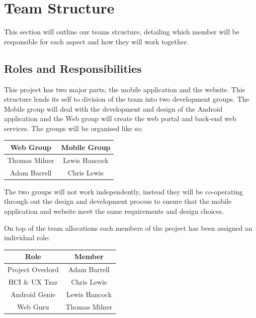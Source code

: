 \documentclass[11pt,a4paper]{article}
\begin{document}
\section{Team Structure}
\label{sec:team-structure}
This section will outline our teams structure, detailing which member will be responsible for each aspect and how they will work together. 

\subsection{Roles and Responsibilities}
This project has two major parts, the mobile application and the website. This structure lends its self to division of the team into two development groups. The Mobile group will deal with the development and design of the Android application and the Web group will create the web portal and back-end web services. The groups will be organised like so;  
\begin{table}[h]
\begin{center}
\begin{tabular}{|c|c|}
\hline
\textbf{Web Group} & \textbf{Mobile Group} \\
\hline
Thomas Milner & Lewis Hancock \\
Adam Barrell & Chris Lewis \\ \hline
\end{tabular}
\end{center}
\end{table}%

The two groups will not work independently, instead they will be co-operating through out the design and development process to ensure that the mobile application and website meet the same requirements and design choices. 

On top of the team allocations each members of the project has been assigned an individual role:

\begin{table}[h]
\begin{center}
\begin{tabular}{|c|c|}
\hline
\textbf{Role} & \textbf{Member} \\
\hline
Project Overlord & Adam Barrell  \\\hline
HCI \& UX Tzar & Chris Lewis \\ \hline
Android Genie & Lewis Hancock \\\hline
Web Guru & Thomas Milner \\\hline
\end{tabular}
\end{center}
\end{table}%
\end{document}
